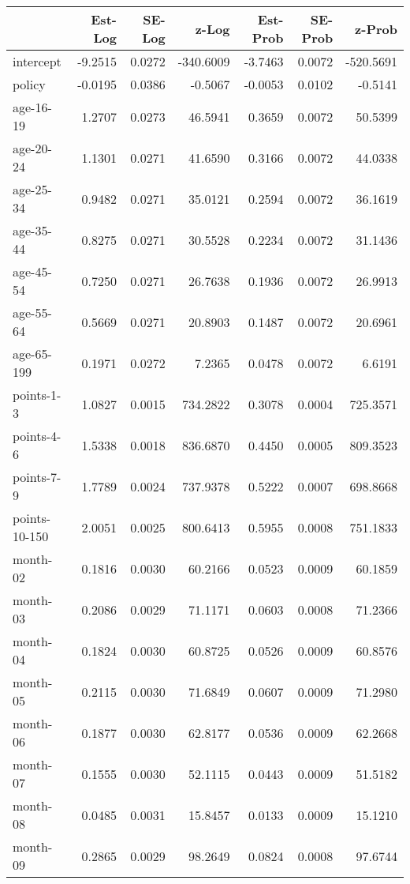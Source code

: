 \documentclass[10pt]{article}
\begin{document}
\begin{table}[ht]
\centering
\begin{tabular}{lrrrrrr}
  \hline
 & Est-Log & SE-Log & z-Log & Est-Prob & SE-Prob & z-Prob \\ 
  \hline
intercept & -9.2515 & 0.0272 & -340.6009 & -3.7463 & 0.0072 & -520.5691 \\ 
  policy & -0.0195 & 0.0386 & -0.5067 & -0.0053 & 0.0102 & -0.5141 \\ 
  age-16-19 & 1.2707 & 0.0273 & 46.5941 & 0.3659 & 0.0072 & 50.5399 \\ 
  age-20-24 & 1.1301 & 0.0271 & 41.6590 & 0.3166 & 0.0072 & 44.0338 \\ 
  age-25-34 & 0.9482 & 0.0271 & 35.0121 & 0.2594 & 0.0072 & 36.1619 \\ 
  age-35-44 & 0.8275 & 0.0271 & 30.5528 & 0.2234 & 0.0072 & 31.1436 \\ 
  age-45-54 & 0.7250 & 0.0271 & 26.7638 & 0.1936 & 0.0072 & 26.9913 \\ 
  age-55-64 & 0.5669 & 0.0271 & 20.8903 & 0.1487 & 0.0072 & 20.6961 \\ 
  age-65-199 & 0.1971 & 0.0272 & 7.2365 & 0.0478 & 0.0072 & 6.6191 \\ 
  points-1-3 & 1.0827 & 0.0015 & 734.2822 & 0.3078 & 0.0004 & 725.3571 \\ 
  points-4-6 & 1.5338 & 0.0018 & 836.6870 & 0.4450 & 0.0005 & 809.3523 \\ 
  points-7-9 & 1.7789 & 0.0024 & 737.9378 & 0.5222 & 0.0007 & 698.8668 \\ 
  points-10-150 & 2.0051 & 0.0025 & 800.6413 & 0.5955 & 0.0008 & 751.1833 \\ 
  month-02 & 0.1816 & 0.0030 & 60.2166 & 0.0523 & 0.0009 & 60.1859 \\ 
  month-03 & 0.2086 & 0.0029 & 71.1171 & 0.0603 & 0.0008 & 71.2366 \\ 
  month-04 & 0.1824 & 0.0030 & 60.8725 & 0.0526 & 0.0009 & 60.8576 \\ 
  month-05 & 0.2115 & 0.0030 & 71.6849 & 0.0607 & 0.0009 & 71.2980 \\ 
  month-06 & 0.1877 & 0.0030 & 62.8177 & 0.0536 & 0.0009 & 62.2668 \\ 
  month-07 & 0.1555 & 0.0030 & 52.1115 & 0.0443 & 0.0009 & 51.5182 \\ 
  month-08 & 0.0485 & 0.0031 & 15.8457 & 0.0133 & 0.0009 & 15.1210 \\ 
  month-09 & 0.2865 & 0.0029 & 98.2649 & 0.0824 & 0.0008 & 97.6744 \\ 

\end{tabular}
\end{table}
\end{document}
